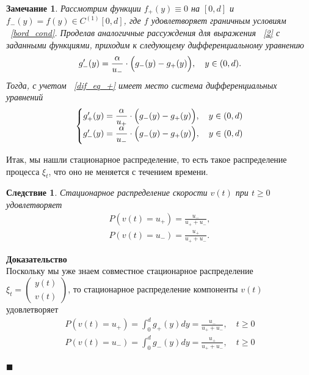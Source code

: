 \documentclass[12pt,a4paper]{article}
\newtheorem{zam}{Замечание}
\newtheorem{sled}{Следствие}
\begin{document}
\begin{zam}
Рассмотрим функции $f_+ (y) \equiv 0$ на $[0, d]$ и $f_- (y) = f (y) \in C^{(1)} [0, d]$, где $f$ удовлетворяет граничным условиям ~\eqref{bord_cond}. Проделав аналогичные рассуждения для выражения ~\eqref{2} с заданными функциями, приходим к следующему дифференциальному уравнению
\begin{equation*}
    g_-' (y) = \frac{\alpha}{u_-} \cdot \Bigl( g_- (y) - g_+ (y) \Bigr), \quad y \in (0, d).
\end{equation*}
Тогда, с учетом ~\eqref{dif_eq_+} имеет место система дифференциальных уравнений
\begin{equation}\label{simple_case}
    \begin{aligned}
        \left\{\begin{matrix}
            g_+' (y) = \displaystyle\frac{\alpha}{u_+} \cdot \Bigl( g_- (y) - g_+ (y) \Bigr), \quad y \in (0, d)\\
            g_-' (y) = \displaystyle\frac{\alpha}{u_-} \cdot \Bigl( g_- (y) - g_+ (y) \Bigr), \quad y \in (0, d)
        \end{matrix}\right.
    \end{aligned}
\end{equation}
\end{zam}

Итак, мы нашли стационарное распределение, то есть такое распределение процесса $\xi_t$, что оно не меняется с течением времени. 

\begin{sled}
Стационарное распределение скорости $v(t)$ при $t \ge 0$ удовлетворяет
\begin{equation*}
\begin{aligned}
    P (v(t) = u_+) = \frac{u_-}{u_+ + u_-},\\
    P (v(t) = u_-) = \frac{u_+}{u_+ + u_-}.
    \end{aligned}
\end{equation*}
\end{sled}
{\bf Доказательство}\\
Поскольку мы уже знаем совместное стационарное распределение $\xi_t = \begin{pmatrix}
 y(t) \\
 v(t)
\end{pmatrix}$, то стационарное распределение компоненты $v(t)$ удовлетворяет
\begin{equation*}
    \begin{aligned}
        P (v(t) = u_+) = \int_0^d g_+(y) dy = \frac{u_-}{u_+ + u_-}, \quad t \ge 0\\
        P (v(t) = u_-) = \int_0^d g_-(y) dy = \frac{u_+}{u_+ + u_-}, \quad t \ge 0
    \end{aligned}
\end{equation*}
\begin{flushright}
$\blacksquare$
\end{flushright}
\end{document}
